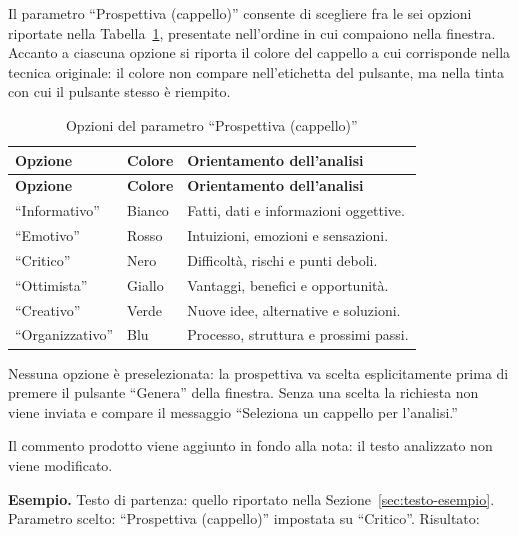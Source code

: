 \documentclass[a4paper, 10pt]{article}
\begin{document}
Il parametro ``Prospettiva (cappello)'' consente di scegliere fra le sei opzioni riportate nella Tabella~\ref{tab:prospettive-analisi}, presentate nell'ordine in cui compaiono nella finestra. Accanto a ciascuna opzione si riporta il colore del cappello a cui corrisponde nella tecnica originale: il colore non compare nell'etichetta del pulsante, ma nella tinta con cui il pulsante stesso è riempito.

\begingroup
\small
\begin{longtable}{|p{2.6cm}|p{1.8cm}|p{8.2cm}|}
    \caption{Opzioni del parametro ``Prospettiva (cappello)''}
    \label{tab:prospettive-analisi} \\
    \hline
    \textbf{Opzione} & \textbf{Colore} & \textbf{Orientamento dell'analisi} \\
    \hline
    \endfirsthead
    \hline
    \textbf{Opzione} & \textbf{Colore} & \textbf{Orientamento dell'analisi} \\
    \hline
    \endhead
    ``Informativo'' & Bianco & Fatti, dati e informazioni oggettive. \\ \hline

    ``Emotivo'' & Rosso & Intuizioni, emozioni e sensazioni. \\ \hline

    ``Critico'' & Nero & Difficoltà, rischi e punti deboli. \\ \hline

    ``Ottimista'' & Giallo & Vantaggi, benefici e opportunità. \\ \hline

    ``Creativo'' & Verde & Nuove idee, alternative e soluzioni. \\ \hline

    ``Organizzativo'' & Blu & Processo, struttura e prossimi passi. \\ \hline

\end{longtable}
\endgroup

Nessuna opzione è preselezionata: la prospettiva va scelta esplicitamente prima di premere il pulsante ``Genera'' della finestra. Senza una scelta la richiesta non viene inviata e compare il messaggio ``Seleziona un cappello per l'analisi.''

Il commento prodotto viene aggiunto in fondo alla nota: il testo analizzato non viene modificato.

\vspace{0.5em}

\noindent
\textbf{Esempio.} Testo di partenza: quello riportato nella Sezione~\ref{sec:testo-esempio}. Parametro scelto: ``Prospettiva (cappello)'' impostata su ``Critico''. Risultato:
\end{document}
